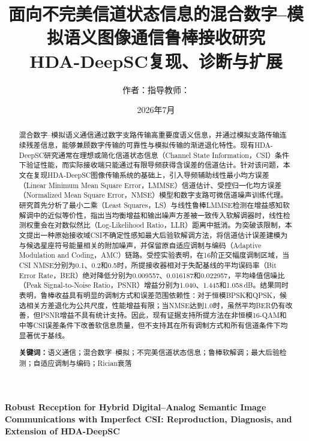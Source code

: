 \documentclass[UTF8,a4paper,11pt]{ctexart}
\title{\heiti 面向不完美信道状态信息的混合数字--模拟语义图像通信鲁棒接收研究\\[0.5em]
{\large HDA-DeepSC复现、诊断与扩展}}
\author{作者：\underline{\hspace{4cm}}\qquad 指导教师：\underline{\hspace{4cm}}}
\date{2026年7月}
\newcommand{\HDADeepSC}{HDA-DeepSC}
\newcommand{\CSI}{CSI}
\newcommand{\AMC}{AMC}
\newcommand{\BER}{BER}
\newcommand{\PSNR}{PSNR}
\newcommand{\NMSE}{NMSE}
\newcommand{\LLR}{LLR}
\begin{document}
\maketitle

\begin{abstract}
混合数字--模拟语义通信通过数字支路传输高重要度语义信息，并通过模拟支路传输连续残差信息，能够兼顾数字传输的可靠性与模拟传输的渐进退化特性。现有\HDADeepSC{}研究通常在理想或简化信道状态信息（Channel State Information，\CSI）条件下验证性能，而实际接收端只能通过有限导频获得含误差的信道估计。针对该问题，本文在复现\HDADeepSC{}图像传输系统的基础上，引入导频辅助线性最小均方误差（Linear Minimum Mean Square Error，LMMSE）信道估计、受控归一化均方误差（Normalized Mean Square Error，\NMSE）模型和数字支路可微信道噪声训练代理。研究首先分析了最小二乘（Least Squares，LS）与线性鲁棒LMMSE检测在增益感知软解调中的近似等价性，指出当均衡增益和输出噪声方差被一致传入软解调器时，线性检测权重会在对数似然比（Log-Likelihood Ratio，\LLR）距离中抵消。为突破该限制，本文提出一种原始接收域\CSI{}不确定性感知最大后验软解调方法，将信道估计误差建模为与候选星座符号能量相关的附加噪声，并保留原自适应调制与编码（Adaptive Modulation and Coding，\AMC）链路。受控实验表明，在16阶正交幅度调制区域，当\CSI{} \NMSE{}分别为0.1、0.2和0.5时，所提接收器相对于失配基线的平均误码率（Bit Error Rate，\BER）绝对降低分别为0.009557、0.016187和0.022957，平均峰值信噪比（Peak Signal-to-Noise Ratio，\PSNR）增益分别为1.040、1.445和1.058\,dB。结果同时表明，鲁棒收益具有明显的调制方式和误差范围依赖性：对于恒模BPSK和QPSK，候选相关方差退化为公共尺度，性能增益有限；当\NMSE{}达到1.0时，虽然平均\BER{}仍有改善，但\PSNR{}增益不具有统计支持。因此，现有证据支持所提方法在非恒模16-QAM和中等\CSI{}误差条件下改善软信息质量，但不支持其在所有调制方式和所有信道条件下均显著优于基线。

\noindent\textbf{关键词：}语义通信；混合数字--模拟；不完美信道状态信息；鲁棒软解调；最大后验检测；自适应调制与编码；Rician衰落
\end{abstract}

\begin{center}
\textbf{Robust Reception for Hybrid Digital--Analog Semantic Image Communications with Imperfect CSI: Reproduction, Diagnosis, and Extension of HDA-DeepSC}
\end{center}
\end{document}
